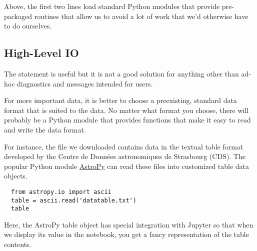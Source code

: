 \documentclass[letterpaper, 12pt, titlepage, twoside]{article}
\begin{document}
Above, the first two lines load standard Python \i{modules} that provide
pre-packaged routines that allow us to avoid a lot of work that we'd otherwise
have to do ourselves.

\subsection*{High-Level IO}

The  statement is useful but it is not a good solution for anything
other than ad-hoc diagnostics and messages intended for users.

For more important data, it is better to choose a preexisting, standard data
format that is suited to the data. No matter what format you choose, there
will probably be a Python \i{module} that provides functions that make it easy
to read and write the data format.

For instance, the file we downloaded contains data in the textual table format
developed by the Centre de Données astronomiques de Strasbourg (CDS). The
popular Python module \href{http://www.astropy.org/}{AstroPy} can read these
files into customized table data objects.

\begin{lstlisting}
  from astropy.io import ascii
  table = ascii.read('datatable.txt')
  table
\end{lstlisting}

Here, the AstroPy table object has special integration with Jupyter so that
when we display its value in the notebook, you get a fancy representation of
the table contents.
\end{document}
